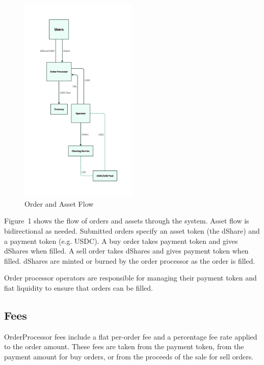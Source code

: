 \documentclass[sigconf,nonacm,prologue,table]{acmart}
\begin{document}
\begin{figure}
\centering
\includegraphics[width = 0.5\textwidth]{flow.d2}
\caption{Order and Asset Flow}
\label{fig:flow}
\end{figure}

Figure~1 shows the flow of orders and assets through the system. Asset flow is bidirectional as needed. Submitted orders specify an asset token (the dShare) and a payment token (e.g. USDC). A buy order takes payment token and gives dShares when filled. A sell order takes dShares and gives payment token when filled. dShares are minted or burned by the order processor as the order is filled. 

Order processor operators are responsible for managing their payment token and fiat liquidity to ensure that orders can be filled.

\subsection{Fees}

OrderProcessor fees include a flat per-order fee and a percentage fee rate applied to the order amount. These fees are taken from the payment token, from the payment amount for buy orders, or from the proceeds of the sale for sell orders.

\end{document}
